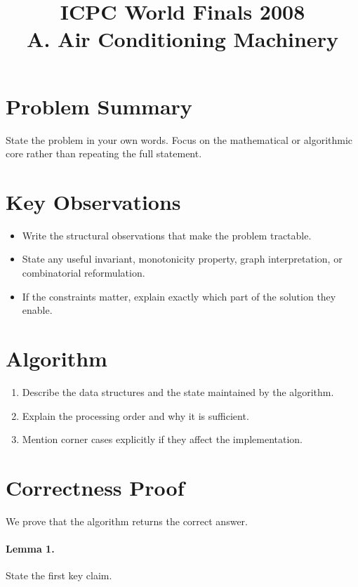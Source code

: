 \documentclass[11pt]{article}
\title{ICPC World Finals 2008\\A. Air Conditioning Machinery}
\author{}
\date{}
\begin{document}
\maketitle

\section*{Problem Summary}

State the problem in your own words. Focus on the mathematical or algorithmic core rather than repeating the full statement.

\section*{Key Observations}

\begin{itemize}[leftmargin=*]
    \item Write the structural observations that make the problem tractable.
    \item State any useful invariant, monotonicity property, graph interpretation, or combinatorial reformulation.
    \item If the constraints matter, explain exactly which part of the solution they enable.
\end{itemize}

\section*{Algorithm}

\begin{enumerate}[leftmargin=*]
    \item Describe the data structures and the state maintained by the algorithm.
    \item Explain the processing order and why it is sufficient.
    \item Mention corner cases explicitly if they affect the implementation.
\end{enumerate}

\section*{Correctness Proof}

We prove that the algorithm returns the correct answer.

\paragraph{Lemma 1.}
State the first key claim.
\end{document}

